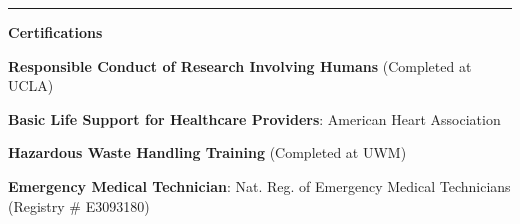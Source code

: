 \documentclass[10pt, oneside]{article}
\newcommand{\hRule}{\textcolor[RGB]{110,110,110}{\rule{\linewidth}{0.2pt}}}
\begin{document}
\hRule{}


{\large \textbf{Certifications}}

    \textbf{Responsible Conduct of Research Involving Humans} (Completed at UCLA)
 
	  
	  

	  \textbf{Basic Life Support for Healthcare Providers}: American Heart Association
	  
	 \textbf{Hazardous Waste Handling Training} (Completed at UWM) 
	 
	 \textbf{Emergency Medical Technician}: Nat. Reg. of Emergency Medical Technicians (Registry \# E3093180)
	 
	

\end{document}
